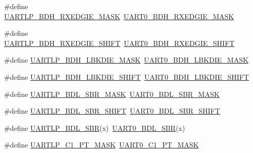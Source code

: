 \begin{DoxyCompactItemize}
\item 
\#define \hyperlink{group___backward___compatibility___symbols_gad02c1fb9539a43c1fea5e16d23505cbd}{U\+A\+R\+T\+L\+P\+\_\+\+B\+D\+H\+\_\+\+R\+X\+E\+D\+G\+I\+E\+\_\+\+M\+A\+SK}~\hyperlink{group___u_a_r_t0___register___masks_ga345980eca350a190e8fc3e39109a0eea}{U\+A\+R\+T0\+\_\+\+B\+D\+H\+\_\+\+R\+X\+E\+D\+G\+I\+E\+\_\+\+M\+A\+SK}
\item 
\#define \hyperlink{group___backward___compatibility___symbols_ga9128322e4fc496b2e73502b8fe09062e}{U\+A\+R\+T\+L\+P\+\_\+\+B\+D\+H\+\_\+\+R\+X\+E\+D\+G\+I\+E\+\_\+\+S\+H\+I\+FT}~\hyperlink{group___u_a_r_t0___register___masks_gad8f5143553887979638377da46673dfc}{U\+A\+R\+T0\+\_\+\+B\+D\+H\+\_\+\+R\+X\+E\+D\+G\+I\+E\+\_\+\+S\+H\+I\+FT}
\item 
\#define \hyperlink{group___backward___compatibility___symbols_ga8e7625a181ceadbf341a36dfcb59db33}{U\+A\+R\+T\+L\+P\+\_\+\+B\+D\+H\+\_\+\+L\+B\+K\+D\+I\+E\+\_\+\+M\+A\+SK}~\hyperlink{group___u_a_r_t0___register___masks_ga84132309b565d272671dde5d912a1611}{U\+A\+R\+T0\+\_\+\+B\+D\+H\+\_\+\+L\+B\+K\+D\+I\+E\+\_\+\+M\+A\+SK}
\item 
\#define \hyperlink{group___backward___compatibility___symbols_gaeda76f3a18048d7d090663cff717da2c}{U\+A\+R\+T\+L\+P\+\_\+\+B\+D\+H\+\_\+\+L\+B\+K\+D\+I\+E\+\_\+\+S\+H\+I\+FT}~\hyperlink{group___u_a_r_t0___register___masks_gae43cfa2facfc6b00c2a7b75ed410f407}{U\+A\+R\+T0\+\_\+\+B\+D\+H\+\_\+\+L\+B\+K\+D\+I\+E\+\_\+\+S\+H\+I\+FT}
\item 
\#define \hyperlink{group___backward___compatibility___symbols_ga3a8fa23722acd6ab86121c94976e93f7}{U\+A\+R\+T\+L\+P\+\_\+\+B\+D\+L\+\_\+\+S\+B\+R\+\_\+\+M\+A\+SK}~\hyperlink{group___u_a_r_t0___register___masks_ga63fd23d0429a94909f330f711cccd226}{U\+A\+R\+T0\+\_\+\+B\+D\+L\+\_\+\+S\+B\+R\+\_\+\+M\+A\+SK}
\item 
\#define \hyperlink{group___backward___compatibility___symbols_ga8d8755af50afa7907f2c6124816ce6c0}{U\+A\+R\+T\+L\+P\+\_\+\+B\+D\+L\+\_\+\+S\+B\+R\+\_\+\+S\+H\+I\+FT}~\hyperlink{group___u_a_r_t0___register___masks_gab076db54da38acfc6ba27dfa8431a8b2}{U\+A\+R\+T0\+\_\+\+B\+D\+L\+\_\+\+S\+B\+R\+\_\+\+S\+H\+I\+FT}
\item 
\#define \hyperlink{group___backward___compatibility___symbols_gab2475ad9e99cdd6c2ac14fa469535b73}{U\+A\+R\+T\+L\+P\+\_\+\+B\+D\+L\+\_\+\+S\+BR}(x)~\hyperlink{group___u_a_r_t0___register___masks_ga3ab33671ed0cd6f39fe5b6fb2b7a7380}{U\+A\+R\+T0\+\_\+\+B\+D\+L\+\_\+\+S\+BR}(x)
\item 
\#define \hyperlink{group___backward___compatibility___symbols_ga6f06cd43d0baed63132675d89a9b89ff}{U\+A\+R\+T\+L\+P\+\_\+\+C1\+\_\+\+P\+T\+\_\+\+M\+A\+SK}~\hyperlink{group___u_a_r_t0___register___masks_gaba11d4d0be5a31499a920b0d6904006d}{U\+A\+R\+T0\+\_\+\+C1\+\_\+\+P\+T\+\_\+\+M\+A\+SK}

\end{DoxyCompactItemize}

